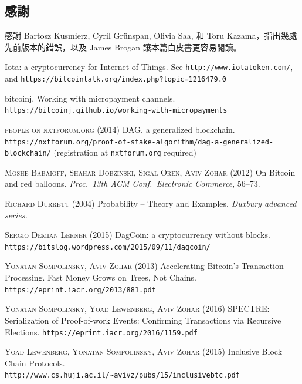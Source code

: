 \documentclass[12pt]{article}
\begin{document}
\begin{CJK}{UTF8}{bkai}
\section*{感謝}
感謝 Bartosz Kusmierz, Cyril Gr\"unspan,
Olivia Saa, 和
 Toru Kazama，指出幾處先前版本的錯誤，以及 James Brogan
讓本篇白皮書更容易閱讀。



\begin{thebibliography}{9}
 Iota: a cryptocurrency for Internet-of-Things.
See \texttt{http://www.iotatoken.com/}, and
\texttt{https://bitcointalk.org/index.php?topic=1216479.0}

  bitcoinj.  
Working with micropayment channels.\\
\texttt{https://bitcoinj.github.io/working-with-micropayments}

\textsc{people on nxtforum.org}  (2014)
DAG, a generalized blockchain.
\texttt{https://nxtforum.org/proof-of-stake-algorithm/dag-a-generalized-blockchain/}  (registration at \texttt{nxtforum.org} required)

\textsc{Moshe Babaioff, Shahar Dobzinski, Sigal Oren, Aviv Zohar} (2012)
On Bitcoin and red balloons.
\textit{Proc.\ 13th ACM Conf.\ Electronic Commerce}, 56--73. 


 \textsc{Richard Durrett} (2004)
Probability -- Theory and Examples.
\textit{Duxbury advanced series.}


 \textsc{Sergio Demian Lerner} (2015)
DagCoin: a cryptocurrency without blocks.
\texttt{https://bitslog.wordpress.com/2015/09/11/dagcoin/}

 \textsc{Yonatan Sompolinsky, Aviv Zohar} (2013)
Accelerating Bitcoin's Transaction Processing.
Fast Money Grows on Trees, Not Chains.
\texttt{https://eprint.iacr.org/2013/881.pdf}

 \textsc{Yonatan Sompolinsky, Yoad Lewenberg, Aviv Zohar} (2016)
SPECTRE:
Serialization of Proof-of-work Events: Confirming Transactions via
Recursive Elections.
\texttt{https://eprint.iacr.org/2016/1159.pdf}

 \textsc{Yoad Lewenberg, Yonatan Sompolinsky, Aviv Zohar} 
(2015)
Inclusive Block Chain Protocols.\\
\texttt{http://www.cs.huji.ac.il/\textasciitilde{}avivz/pubs/15/inclusive\underline{\phantom{m}}btc.pdf}


\end{thebibliography}
\end{CJK}
\end{document}
